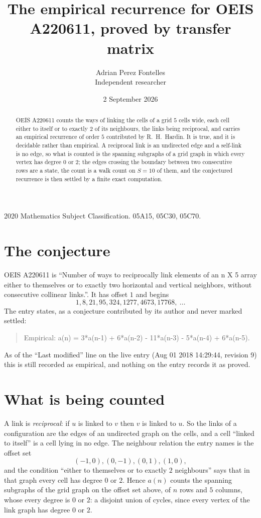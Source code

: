 \documentclass[11pt,a4paper]{article}
\title{The empirical recurrence for OEIS A220611, proved by transfer matrix}
\author{Adrian Perez Fontelles\\ \small Independent researcher}
\date{2 September 2026}
\theoremstyle{plain}
\theoremstyle{definition}
\begin{document}
\maketitle

\begin{abstract}
OEIS A220611 counts the ways of linking the cells of a grid $5$ cells wide, each cell either to
itself or to exactly $2$ of its neighbours, the links being reciprocal, and carries an
empirical recurrence of order $5$ contributed by R.~H.~Hardin. It is true, and it is
decidable rather than empirical. A reciprocal link is an undirected edge and a self-link is
no edge, so what is counted is the spanning subgraphs of a grid graph in which every vertex
has degree $0$ or $2$; the edges crossing the boundary between two consecutive rows are a
state, the count is a walk count on $S=10$ of them, and the conjectured recurrence is then
settled by a finite exact computation.
\end{abstract}

\noindent\small 2020 Mathematics Subject Classification. 05A15, 05C30, 05C70.\normalsize

\section{The conjecture}

OEIS A220611 is ``Number of ways to reciprocally link elements of an n X 5 array either to themselves or to exactly two horizontal and vertical neighbors, without consecutive collinear links.''. It has offset $1$ and begins
\[
1, 8, 21, 95, 324, 1277, 4673, 17768,\ \dots
\]
The entry states, as a conjecture contributed by its author and never marked settled:
\begin{quote}
Empirical: a(n) = 3*a(n-1) + 6*a(n-2) - 11*a(n-3) - 5*a(n-4) + 6*a(n-5).
\end{quote}
As of the ``Last modified'' line on the live entry (Aug 01 2018 14:29:44, revision 9) this is still
recorded as empirical, and nothing on the entry records it as proved.

\section{What is being counted}

A link is \emph{reciprocal}: if $u$ is linked to $v$ then $v$ is linked to $u$. So the links
of a configuration are the edges of an undirected graph on the cells, and a cell ``linked to
itself'' is a cell lying in no edge. The neighbour relation the entry names is the offset set
\[
(-1,0), (0,-1), (0,1), (1,0),
\]
and the condition ``either to themselves or to exactly $2$ neighbours'' says that in that
graph every cell has degree $0$ or $2$. Hence $a(n)$ counts the spanning subgraphs of the
grid graph on the offset set above, of $n$ rows and $5$ columns,
whose every degree is $0$ or $2$: a disjoint union of cycles, since every vertex of the link graph has degree $0$ or $2$.
\end{document}
